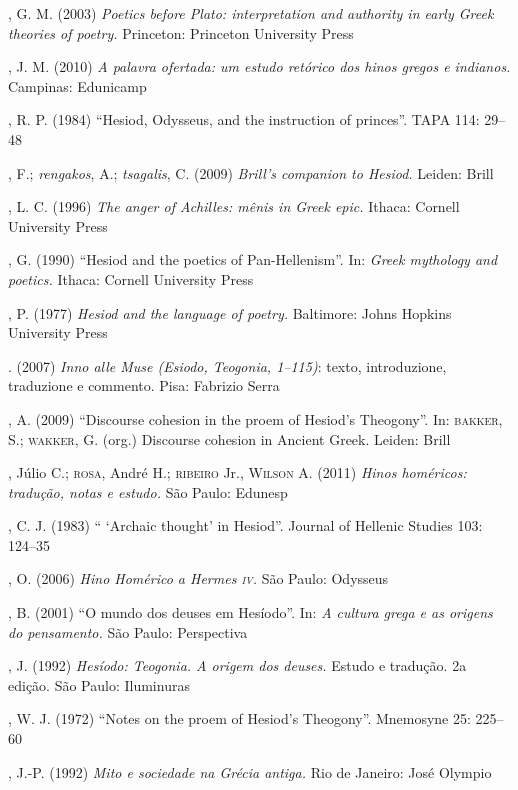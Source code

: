 \begin{bibliohedra}
, G. M. (2003) \textit{Poetics before Plato: interpretation and
authority in early Greek theories of poetry.} Princeton: Princeton University
Press
  
, J. M. (2010) \textit{A palavra ofertada: um estudo retórico dos
hinos gregos e indianos.} Campinas: Edunicamp
  
, R. P. (1984) “Hesiod, Odysseus, and the instruction of princes”.
TAPA 114: 29--48
  
, F.; \textit{rengakos}, A.; \textit{tsagalis}, C. (2009)
\textit{Brill’s companion to Hesiod.} Leiden: Brill
  
, L. C. (1996) \textit{The anger of Achilles: mênis in Greek
epic.} Ithaca: Cornell University Press
  
, G. (1990) “Hesiod and the poetics of Pan-Hellenism”. In:
\textit{Greek mythology and poetics.} Ithaca: Cornell University Press 
  
, P. (1977) \textit{Hesiod and the language of poetry.} Baltimore:
Johns Hopkins University Press
  
\titidem{}. (2007) \textit{Inno alle Muse (Esiodo, Teogonia, 1--115)}: texto,
introduzione, traduzione e commento. Pisa: Fabrizio Serra
  
, A. (2009) “Discourse cohesion in the proem of Hesiod’s
Theogony”. In: \textsc{bakker}, S.; \textsc{wakker}, G. (org.) Discourse
cohesion in Ancient Greek. Leiden: Brill
  
, Júlio C.; \textsc{rosa}, André H.; \textsc{ribeiro} Jr.,
\textsc{Wilson} A. (2011) \textit{Hinos homéricos: tradução, notas e estudo.}
São Paulo: Edunesp
  
, C. J. (1983) “ ‘Archaic thought’ in Hesiod”. Journal of Hellenic
Studies 103: 124--35
  
, O. (2006) \textit{Hino Homérico a Hermes \textsc{iv}.} São Paulo:
Odysseus
  
, B.  (2001) “O mundo dos deuses em Hesíodo”. In: \textit{A cultura
grega e as origens do pensamento.} São Paulo: Perspectiva
  
, J. (1992) \textit{Hesíodo: Teogonia. A origem dos deuses.}
Estudo e tradução. 2a edição. São Paulo: Iluminuras
  
, W. J. (1972) “Notes on the proem of Hesiod’s Theogony”.
Mnemosyne 25: 225--60
  
, J.-P. (1992) \textit{Mito e sociedade na Grécia antiga.} Rio de
Janeiro: José Olympio
  

\end{bibliohedra}
